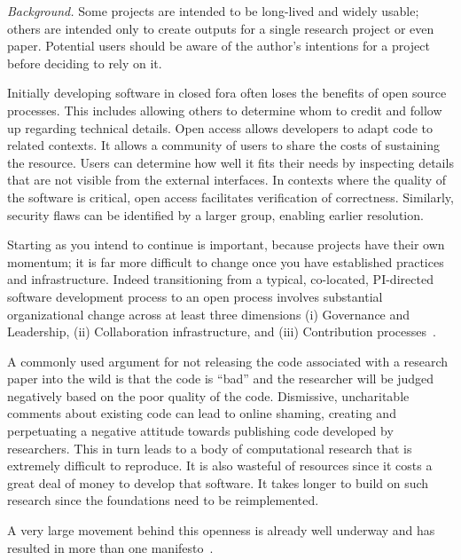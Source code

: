 \documentclass[a4paper,UKenglish]{dagman}
\begin{document}
\emph{Background.}
Some projects are intended to be long-lived and widely usable; others are intended only to create outputs for a single research project or even paper. Potential users should be aware of the author's intentions for a project before deciding to rely on it.

Initially developing software in closed fora often loses the benefits of open source processes. This includes allowing others to determine whom to credit and follow up regarding technical details. Open access allows developers to adapt code to related contexts. It allows a community of users to share the costs of sustaining the resource. Users can determine how well it fits their needs by inspecting details that are not visible from the external interfaces. In contexts where the quality of the software is critical, open access facilitates verification of correctness. Similarly, security flaws can be identified by a larger group, enabling earlier resolution.

Starting as you intend to continue is important, because projects have their own momentum; it is far more difficult to change once you have established practices and infrastructure. Indeed transitioning from a typical, co-located, PI-directed software development process to an open process involves substantial organizational change across at least three dimensions (i) Governance and Leadership, (ii) Collaboration infrastructure, and (iii) Contribution processes~\cite{howison2014collaboration}.

A commonly used argument for not releasing the code associated with a research paper into the wild is that the code is ``bad'' and the researcher will be judged negatively based on the poor quality of the code.
Dismissive, uncharitable comments about existing code can lead to online shaming, creating and perpetuating a negative attitude towards publishing code developed by researchers.
This in turn leads to a body of computational research that is extremely difficult to reproduce. It is also wasteful of resources since it costs a great deal of money to develop that software. It takes longer to build on such research since the foundations need to be reimplemented.

A very large movement behind this openness is already well underway and has resulted in more than one manifesto~\cite{barba_reproducibility_2012,alex_holcombe_open_2011}.
\end{document}
